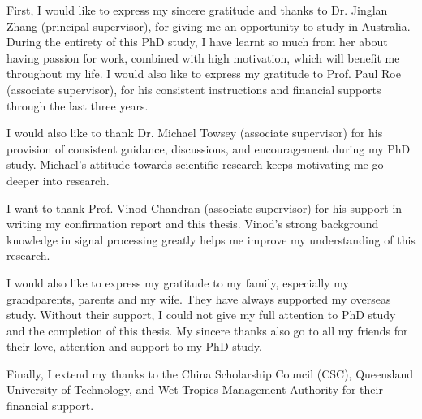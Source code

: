 \begin{ack}
First, I would like to express my sincere gratitude and thanks to Dr. Jinglan Zhang (principal supervisor), for giving me an opportunity to study in Australia. During the entirety of this PhD study, I have learnt so much from her about having passion for work, combined with high motivation, which will benefit me throughout my life. 
I would also like to express my gratitude to Prof. Paul Roe (associate supervisor), for his consistent instructions and financial supports through the last three years.  

I would also like to thank Dr. Michael Towsey (associate supervisor) for his provision of consistent guidance, discussions, and encouragement during my PhD study. Michael's attitude towards scientific research keeps motivating me go deeper into research.  


I want to thank Prof. Vinod Chandran (associate supervisor) for his support in writing my confirmation report and this thesis. Vinod's strong background knowledge in signal processing greatly helps me improve my understanding of this research.

I would also like to express my gratitude to my family, especially my grandparents, parents and my wife. They have always supported my overseas study. Without their support, I could not give my full attention to PhD study and  the completion of this thesis. 
My sincere thanks also go to all my friends for their love, attention and support to my PhD study. 

Finally, I extend my thanks to the China Scholarship Council (CSC), Queensland University of Technology, and Wet Tropics Management Authority for their financial support. 

\end{ack}





\afterpreface
